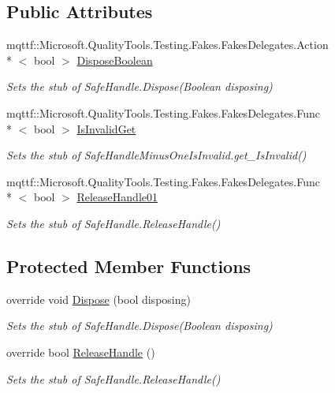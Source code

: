 \subsection*{Public Attributes}
\begin{DoxyCompactItemize}
\item 
mqttf\-::\-Microsoft.\-Quality\-Tools.\-Testing.\-Fakes.\-Fakes\-Delegates.\-Action\\*
$<$ bool $>$ \hyperlink{class_microsoft_1_1_win32_1_1_safe_handles_1_1_fakes_1_1_stub_safe_handle_minus_one_is_invalid_a16100425278e35fcd688a36f8134567e}{Dispose\-Boolean}
\begin{DoxyCompactList}\small\item\em Sets the stub of Safe\-Handle.\-Dispose(\-Boolean disposing)\end{DoxyCompactList}\item 
mqttf\-::\-Microsoft.\-Quality\-Tools.\-Testing.\-Fakes.\-Fakes\-Delegates.\-Func\\*
$<$ bool $>$ \hyperlink{class_microsoft_1_1_win32_1_1_safe_handles_1_1_fakes_1_1_stub_safe_handle_minus_one_is_invalid_a1dc18bb53ebfc8a778dd75b6aa918c4d}{Is\-Invalid\-Get}
\begin{DoxyCompactList}\small\item\em Sets the stub of Safe\-Handle\-Minus\-One\-Is\-Invalid.\-get\-\_\-\-Is\-Invalid()\end{DoxyCompactList}\item 
mqttf\-::\-Microsoft.\-Quality\-Tools.\-Testing.\-Fakes.\-Fakes\-Delegates.\-Func\\*
$<$ bool $>$ \hyperlink{class_microsoft_1_1_win32_1_1_safe_handles_1_1_fakes_1_1_stub_safe_handle_minus_one_is_invalid_aa483ce9dce2744f2fd30227f2675e248}{Release\-Handle01}
\begin{DoxyCompactList}\small\item\em Sets the stub of Safe\-Handle.\-Release\-Handle()\end{DoxyCompactList}\end{DoxyCompactItemize}
\subsection*{Protected Member Functions}
\begin{DoxyCompactItemize}
\item 
override void \hyperlink{class_microsoft_1_1_win32_1_1_safe_handles_1_1_fakes_1_1_stub_safe_handle_minus_one_is_invalid_a85b0c55e83875eb7dcb12d3bed784bee}{Dispose} (bool disposing)
\begin{DoxyCompactList}\small\item\em Sets the stub of Safe\-Handle.\-Dispose(\-Boolean disposing)\end{DoxyCompactList}\item 
override bool \hyperlink{class_microsoft_1_1_win32_1_1_safe_handles_1_1_fakes_1_1_stub_safe_handle_minus_one_is_invalid_aadfce38ff13974fd310c359e92f3369a}{Release\-Handle} ()
\begin{DoxyCompactList}\small\item\em Sets the stub of Safe\-Handle.\-Release\-Handle()\end{DoxyCompactList}\end{DoxyCompactItemize}

